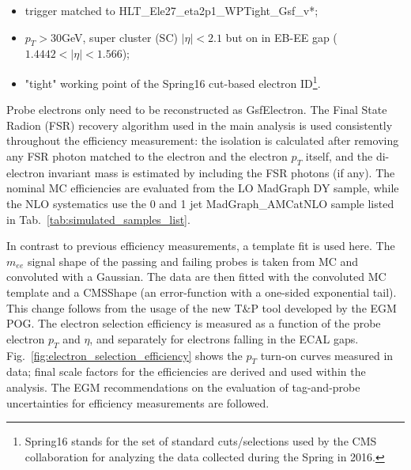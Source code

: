 \begin{itemize}
	\item trigger matched to HLT\_Ele27\_eta2p1\_WPTight\_Gsf\_v*;
	\item $p_{T} > 30$GeV, super cluster (SC) $|\eta| < 2.1$ but on in EB-EE gap ($1.4442 < |\eta| < 1.566$);
	\item "tight" working point of the Spring16 cut-based electron ID\footnote{Spring16 stands for the set of standard cuts/selections used by the CMS collaboration for analyzing the data collected during the Spring in 2016.}.
\end{itemize}

Probe electrons only need to be reconstructed as GsfElectron. The Final State Radion (FSR) recovery algorithm used in the main analysis is used consistently throughout the efficiency measurement: the isolation is calculated after removing any FSR photon matched to the electron and the electron $p_{T}$ itself, and the di-electron invariant mass is estimated by including the FSR photons (if any). The nominal MC efficiencies are evaluated from the LO MadGraph DY sample, while the NLO systematics use the 0 and 1 jet MadGraph\_AMCatNLO sample listed in Tab.~\ref{tab:simulated_samples_list}.

In contrast to previous efficiency measurements, a template fit is used here. The $m_{ee}$ signal shape of the passing and failing probes is taken from MC and convoluted with a Gaussian. The data are then fitted with the convoluted MC template and a CMSShape (an error-function with a one-sided exponential tail). This change follows from the usage of the new T$\&$P tool developed by the EGM POG. The electron selection efficiency is measured as a function of the probe electron $p_{T}$ and $\eta$, and separately for electrons falling in the ECAL gaps. Fig.~\ref{fig:electron_selection_efficiency} shows the $p_{T}$ turn-on curves measured in data; final scale factors for the efficiencies are derived and used within the analysis. The EGM recommendations on the evaluation of tag-and-probe uncertainties for efficiency measurements are followed.


